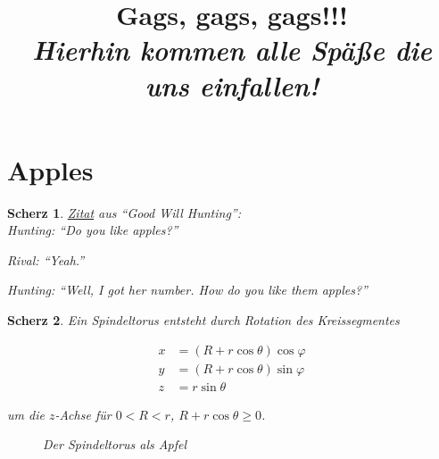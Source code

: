 \documentclass{article}
\title
{
    Gags, gags, gags!!! \\
    \vspace{4pt}
    \normalsize
    \textit{Hierhin kommen alle Späße die uns einfallen!}
}
\author{}
\date{}
\newtheorem{gag}{Scherz}[section]
\begin{document}
\maketitle

\section{Apples}

\begin{gag}

    \href{https://knowyourphrase.com/how-do-you-like-them-apples}{Zitat} aus \enquote{Good Will Hunting}: \\

    Hunting:
    \enquote{Do you like apples?}

    Rival:
    \enquote{Yeah.}

    Hunting:
    \enquote{Well, I got her number. How do you like them apples?}

\end{gag}

\begin{gag}

    Ein \textit{Spindeltorus} entsteht durch Rotation des Kreissegmentes

    \begin{align*}
        x & = (R + r \cos{\theta}) \cos{\varphi} \\
        y & = (R + r \cos{\theta}) \sin{\varphi} \\
        z & = r \sin{\theta}
    \end{align*}

    um die $z$-Achse für $0 < R < r$, $R + r \cos{\theta} \geq 0$.

    \begin{figure}[H]
        \centering
        \hspace{0mm}
        \caption{Der Spindeltorus als Apfel}
        \label{fig:apfel_apple}
    \end{figure}

\end{gag}
\end{document}
